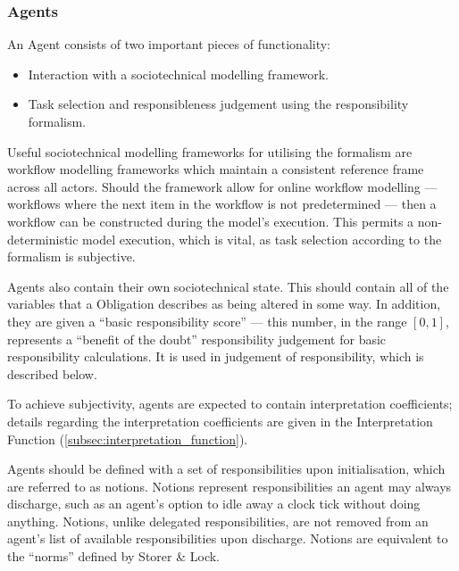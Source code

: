 \subsubsection{Agents}  %
An Agent consists of two important pieces of functionality:

\begin{itemize}
    \item Interaction with a sociotechnical modelling framework.
    \item Task selection and responsibleness judgement using the responsibility formalism.
\end{itemize}

Useful sociotechnical modelling frameworks for utilising the formalism are workflow modelling frameworks which maintain a consistent reference frame across all actors. Should the framework allow for online workflow modelling --- workflows where the next item in the workflow is not predetermined --- then a workflow can be constructed during the model's execution. This permits a non-deterministic model execution, which is vital, as task selection according to the formalism is subjective.\par

Agents also contain their own sociotechnical state. This should contain all of the variables that a Obligation describes as being altered in some way. In addition, they are given a ``basic responsibility score'' --- this number, in the range \([0,1]\), represents a ``benefit of the doubt'' responsibility judgement for basic responsibility calculations. It is used in judgement of responsibility, which is described below.\par

To achieve subjectivity, agents are expected to contain interpretation coefficients; details regarding the interpretation coefficients are given in the Interpretation Function (\cref{subsec:interpretation_function}).\par

Agents should be defined with a set of responsibilities upon initialisation, which are referred to as notions. Notions represent responsibilities an agent may always discharge, such as an agent's option to idle away a clock tick without doing anything. Notions, unlike delegated responsibilities, are not removed from an agent's list of available responsibilities upon discharge. Notions are equivalent to the ``norms'' defined by Storer \& Lock\cite{storer2008modelling}.\par

